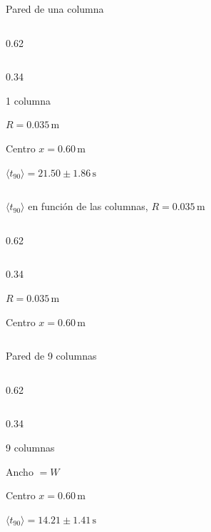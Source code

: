 \documentclass[aspectratio=169,10pt]{beamer}
\begin{document}
\begin{frame}{Pared de una columna}
  \begin{cols}
    \begin{column}{0.62\textwidth}
    \end{column}
    \begin{column}{0.34\textwidth}
      \begin{parametros}
        \item 1 columna
        \item $R = 0.035\,\mathrm{m}$
        \item Centro $x = 0.60\,\mathrm{m}$
      \end{parametros}
      \begin{resultado}
        \item $\langle t_{90}\rangle = 21.50 \pm 1.86\,\mathrm{s}$
      \end{resultado}
    \end{column}
  \end{cols}
\end{frame}

\begin{frame}{$\langle t_{90}\rangle$ en función de las columnas, $R = 0.035\,\mathrm{m}$}
  \begin{cols}
    \begin{column}{0.62\textwidth}
    \end{column}
    \begin{column}{0.34\textwidth}
      \begin{parametros}
        \item $R = 0.035\,\mathrm{m}$
        \item Centro $x = 0.60\,\mathrm{m}$
      \end{parametros}
    \end{column}
  \end{cols}
\end{frame}

\begin{frame}{Pared de 9 columnas}
  \begin{cols}
    \begin{column}{0.62\textwidth}
    \end{column}
    \begin{column}{0.34\textwidth}
      \begin{parametros}
        \item 9 columnas
        \item Ancho $= W$
        \item Centro $x = 0.60\,\mathrm{m}$
      \end{parametros}
      \begin{resultado}
        \item $\langle t_{90}\rangle = 14.21 \pm 1.41\,\mathrm{s}$
      \end{resultado}
    \end{column}
  \end{cols}
\end{frame}
\end{document}
